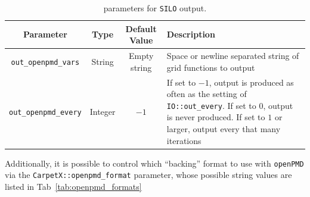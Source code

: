 \begin{table}[ht]
  \centering
  \begin{tabularx}{\textwidth}{cccX}
    Parameter                 & Type    & Default Value  & Description \\\hline\hline
    \texttt{out\_openpmd\_vars}  & String  & Empty string   & Space or newline separated string of grid functions to output \\
    \texttt{out\_openpmd\_every} & Integer & $-1$           & If set to $-1$, output is produced as often as the setting of \texttt{IO::out\_every}. If set to $0$, output is never produced. If set to $1$ or larger, output every that many iterations \\\hline\hline
  \end{tabularx}
  \label{tab:openpmd_params}
  \caption{\CarpetX\space parameters for \texttt{SILO} output.}
\end{table}

Additionally, it is possible to control which ``backing'' format to use with \texttt{openPMD} via the \texttt{CarpetX::openpmd\_format} parameter, whose possible string values are listed in Tab~\ref{tab:openpmd_formats}

